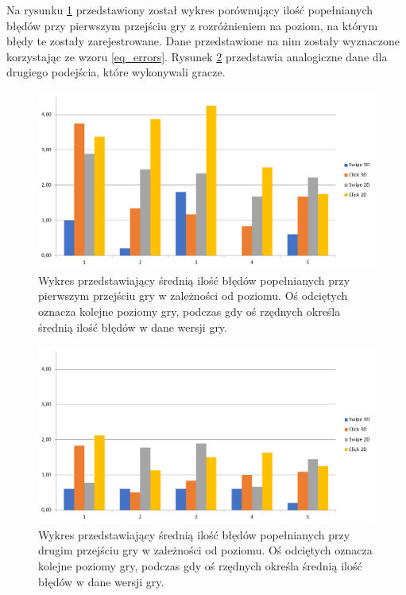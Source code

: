 \documentclass[a4paper,12pt,numbers=noenddot]{report}
\begin{document}
Na rysunku \ref{fig:diag_errors_1} przedstawiony został wykres porównujący ilość popełnianych błędów przy pierwszym przejściu gry z rozróżnieniem na poziom, na którym błędy te zostały zarejestrowane. Dane przedstawione na nim zostały wyznaczone korzystając ze wzoru \ref{eq_errors}. Rysunek \ref{fig:diag_errors_2} przedstawia analogiczne dane dla drugiego podejścia, które wykonywali gracze.


\begin{figure}[h!]
	\centering
  	\includegraphics[width=\linewidth]{diag/errors_1.png}
	\caption{Wykres przedstawiający średnią ilość błędów popełnianych przy pierwszym przejściu gry w zależności od poziomu. Oś odciętych oznacza kolejne poziomy gry, podczas gdy oś rzędnych określa średnią ilość błędów w dane wersji gry.}
	\label{fig:diag_errors_1}
\end{figure}

\begin{figure}[h!]
	\centering
  	\includegraphics[width=\linewidth]{diag/errors_2.png}
	\caption{Wykres przedstawiający średnią ilość błędów popełnianych przy drugim przejściu gry w zależności od poziomu. Oś odciętych oznacza kolejne poziomy gry, podczas gdy oś rzędnych określa średnią ilość błędów w dane wersji gry.}
	\label{fig:diag_errors_2}
\end{figure}
\end{document}
